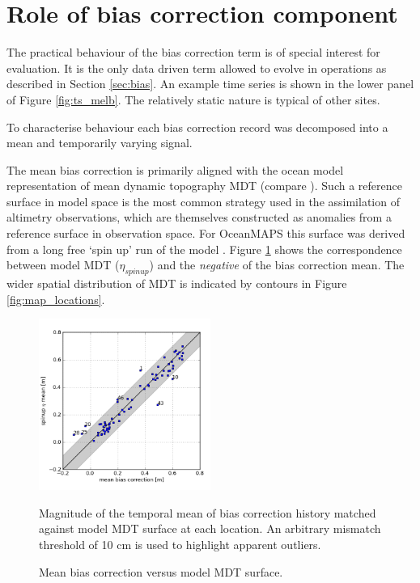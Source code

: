 \section{Role of bias correction component}
\label{sec:bias_more}

The practical behaviour of the bias correction term is of special interest for evaluation.   
It is the only data driven term allowed to evolve in operations as described in Section \ref{sec:bias}.
An example time series is shown in the lower panel of Figure \ref{fig:ts_melb}.
The relatively static nature is typical of other sites.


To characterise behaviour each bias correction record was decomposed into a mean and temporarily varying signal.

The mean bias correction is primarily aligned with the ocean model representation of mean dynamic topography MDT (compare \citep{Slobbe:wk}).
Such a reference surface in model space is the most common strategy used in the assimilation of altimetry observations, which are themselves constructed as anomalies from a reference surface in observation space. For OceanMAPS this surface was derived from a long free `spin up' run of the model \citep{Oke:2013fm}. 
Figure \ref{fig:bias_mean} shows the correspondence between model MDT ($\eta_{spinup}$) and the \textit{negative} of the bias correction mean.   The wider spatial distribution of MDT is indicated by contours in Figure \ref{fig:map_locations}.

\begin{figure}[!hbt] \centering
\includegraphics[width=0.5\textwidth]{figures/plots/aggSL_bias_breakdown_plot_1.png}
\caption{Mean bias correction versus model MDT surface.}{Magnitude of the temporal mean of bias correction history matched against model MDT surface at each location. An arbitrary mismatch threshold of 10 cm is used to highlight apparent outliers.}
\label{fig:bias_mean}
\end{figure}   

